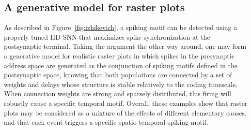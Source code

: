 \documentclass[runningheads]{llncs}
\begin{document}
\subsection{A generative model for raster plots}

As described in Figure~\ref{fig:izhikevich}, a spiking motif can be detected using a properly tuned HD-SNN that maximizes spike synchronization at the postsynaptic terminal. Taking the argument the other way around, one may form a generative model for realistic raster plots in which spikes in the presynaptic address space are generated as the conjunction of spiking motifs defined in the postsynaptic space, knowing that both populations are connected by a set of weights and delays whose structure is stable relatively to the coding timescale. When connection weights are strong and sparsely distributed, this firing will robustly cause a specific temporal motif. Overall, these examples show that raster plots may be considered as a mixture of the effects of different elementary causes, and that each event triggers a specific spatio-temporal spiking motif. 
\end{document}
